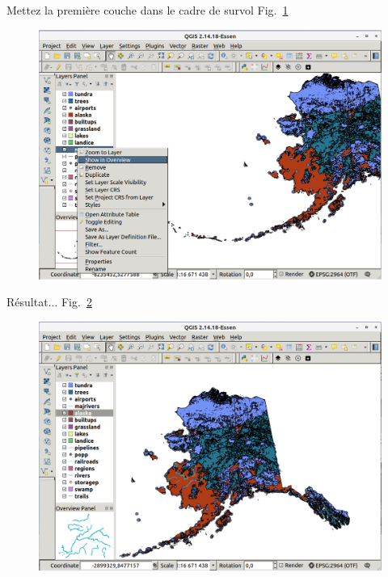 Mettez la premi\`ere couche dans le cadre de survol Fig.~\ref{fig:qgis006}

\begin{figure}[htbp]
   \centering
   \includegraphics[scale=0.2]{qgis006.png}
   \caption{}
   \label{fig:qgis006}
\end{figure}

R\'esultat... Fig.~\ref{fig:qgis007}

\begin{figure}[htbp]
   \centering
   \includegraphics[scale=0.2]{qgis007.png}
   \caption{}
   \label{fig:qgis007}
\end{figure}

